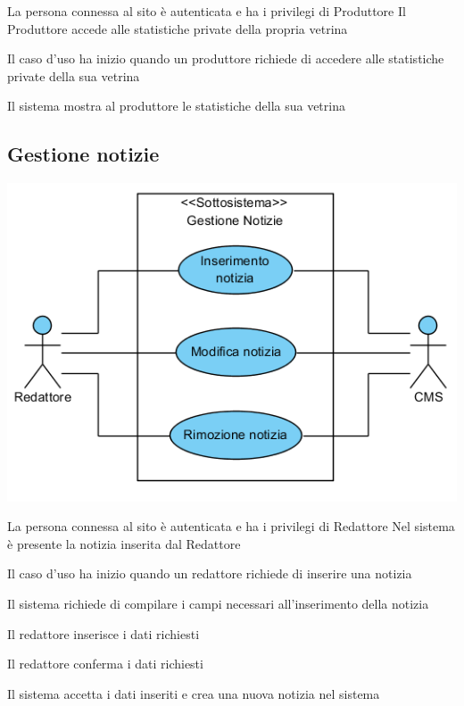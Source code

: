 \tabcuvspace

{}
{La persona connessa al sito è autenticata e ha i privilegi di Produttore}
{Il Produttore accede alle statistiche private della propria vetrina}
{\begin{enumCU}
		\item Il caso d'uso ha inizio quando un produttore richiede di accedere alle statistiche private della sua vetrina
		\item Il sistema mostra al produttore le statistiche della sua vetrina
	\end{enumCU}}


\subsection{Gestione notizie}
\begin{center}
   \includegraphics[width=\textwidth]{assets/visualParadigm/GestioneNotizie}
\end{center}
%
{}
{La persona connessa al sito è autenticata e ha i privilegi di Redattore}
{Nel  sistema è presente la notizia inserita dal Redattore}
{\begin{enumCU}
	\item Il caso d'uso ha inizio quando un redattore richiede di inserire una notizia  
	\item Il sistema richiede di compilare i campi necessari all'inserimento della notizia
	\item Il redattore inserisce i dati richiesti \label{cuinsnot:2}
	\item Il redattore conferma i dati richiesti
	\item Il sistema accetta i dati inseriti e crea una nuova notizia nel sistema
\end{enumCU}}
